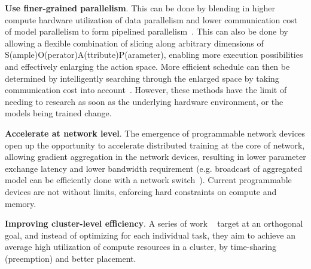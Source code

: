 \noindent\textbf{Use finer-grained parallelism}. This can be done by blending in higher compute hardware utilization of data parallelism and lower communication cost of model parallelism to form pipelined parallelism~\cite{harlap2018pipedream}. This can also be done by allowing a flexible combination of slicing along arbitrary dimensions of S(ample)O(perator)A(ttribute)P(arameter), enabling more execution possibilities and effectively enlarging the action space. More efficient schedule can then be determined by intelligently searching through the enlarged space by taking communication cost into account~\cite{jia2018beyond}. However, these methods have the limit of needing to research as soon as the underlying hardware environment, or the models being trained change.

\noindent\textbf{Accelerate at network level}. The emergence of programmable network devices open up the opportunity to accelerate distributed training at the core of network, allowing gradient aggregation in the network devices, resulting in lower parameter exchange latency and lower bandwidth requirement (e.g. broadcast of aggregated model can be efficiently done with a network switch~\cite{sapio2019scaling,luomotivating}). Current programmable devices are not without limits, enforcing hard constraints on compute and memory.

\noindent\textbf{Improving cluster-level efficiency}. A series of work ~\cite{222611,Shen2018NexusA} target at an orthogonal goal, and instead of optimizing for each individual task, they aim to achieve an average high utilization of compute resources in a cluster, by time-sharing (preemption) and better placement.


